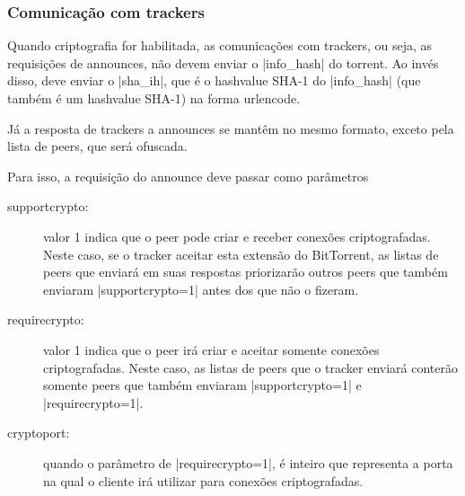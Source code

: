 
\subsubsection*{Comunicação com trackers}

Quando criptografia for habilitada, as comunicações com \glspl*{tracker}, ou seja, as
requisições de \glspl{announce}, não devem enviar o \bverb|info_hash| do \gls*{torrent}.
Ao invés disso, deve enviar o \bverb|sha_ih|, que é o \gls*{hashvalue} SHA-1 do
\bverb|info_hash| (que também é um \gls*{hashvalue} SHA-1) na forma \gls*{urlencode}.

Já a resposta de \glspl*{tracker} a \glspl*{announce} se mantêm no mesmo formato,
exceto pela lista de \glspl*{peer}, que será ofuscada.

Para isso, a requisição do \gls*{announce} deve passar como parâmetros

\begin{description}
    \item[supportcrypto:] valor 1 indica que o \gls*{peer} pode criar e receber
        conexões criptografadas. Neste caso, se o \gls*{tracker} aceitar esta extensão
        do BitTorrent, as listas de \glspl*{peer} que enviará em suas respostas
        priorizarão outros \glspl*{peer} que também enviaram \bverb|supportcrypto=1|
        antes dos que não o fizeram.

    \item[requirecrypto:] valor 1 indica que o \gls*{peer} irá criar e aceitar somente
        conexões criptografadas. Neste caso, as listas de \glspl*{peer} que o
        \gls*{tracker} enviará conterão somente \glspl*{peer} que também enviaram
        \bverb|supportcrypto=1| e \bverb|requirecrypto=1|.

    \item[cryptoport:] quando o parâmetro de \bverb|requirecrypto=1|, é inteiro que
        representa a porta na qual o cliente irá utilizar para conexões criptografadas.
\end{description}

